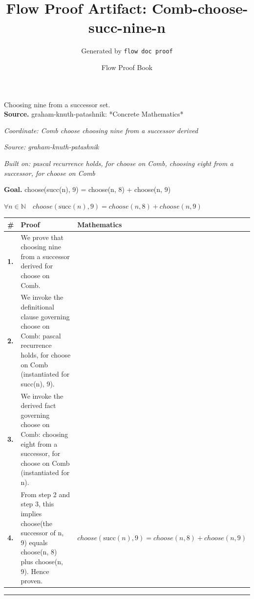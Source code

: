 \documentclass[11pt]{article}
\title{Flow Proof Artifact: Comb-choose-succ-nine-n}
\author{Generated by \texttt{flow doc proof}}
\date{Flow Proof Book}
\theoremstyle{definition}
\begin{document}
\maketitle
Choosing nine from a successor set.\\[0.5em]
\textbf{Source.} graham-knuth-patashnik: *Concrete Mathematics*\\[0.5em]
\bigskip
{}\par
\smallskip\noindent\textit{Coordinate: Comb \cdot choose \cdot choosing nine from a successor derived}\par
\smallskip\noindent\textit{Source: graham-knuth-patashnik}\par
\smallskip\noindent\textit{Built on: pascal recurrence holds, for choose on Comb, choosing eight from a successor, for choose on Comb}\par
\medskip
\noindent\textbf{Goal.} choose(succ(n), 9) = choose(n, 8) + choose(n, 9)\par
\noindent$\displaystyle \forall n \in \mathbb{N}\quad choose(\mathrm{succ}(n), 9) = choose(n, 8) + choose(n, 9)$\par
\medskip
\noindent
\begin{tabular}{@{} >{\raggedright\arraybackslash}p{} >{\raggedright\arraybackslash}p{} >{\raggedleft\arraybackslash}p{} @{}}
\textbf{\#} & \textbf{Proof} & \textbf{Mathematics} \\
\midrule
\textbf{1.} & We prove that choosing nine from a successor derived for choose on Comb. & \\[0.45em]
\textbf{2.} & We invoke the definitional clause governing choose on Comb: pascal recurrence holds, for choose on Comb (instantiated for succ(n), 9). & \\[0.45em]
\textbf{3.} & We invoke the derived fact governing choose on Comb: choosing eight from a successor, for choose on Comb (instantiated for n). & \\[0.45em]
\textbf{4.} & From step 2 and step 3, this implies choose(the successor of n, 9) equals choose(n, 8) plus choose(n, 9). Hence proven. & $\displaystyle choose(\mathrm{succ}(n), 9) = choose(n, 8) + choose(n, 9)$ \\[0.45em]
\bottomrule
\end{tabular}
\label{thm:Comb-choose-choosing_nine_from_a_successor_derived}
\par\medskip\hrule
\end{document}
